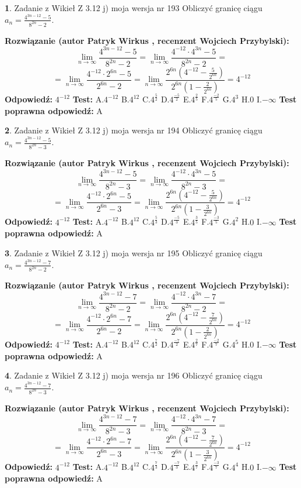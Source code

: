 \documentclass[12pt, a4paper]{article}
\theoremstyle{definition} %
\newtheorem{zad}{}
\newcommand{\zadStart}[1]{\begin{zad}#1\newline}
\newcommand{\zadStop}{\end{zad}}
\newcommand{\rozwStart}[2]{\noindent \textbf{Rozwiązanie (autor #1 , recenzent #2): }\newline}
\newcommand{\rozwStop}{\newline}
\newcommand{\odpStart}{\noindent \textbf{Odpowiedź:}\newline}
\newcommand{\odpStop}{\newline}
\newcommand{\testStart}{\noindent \textbf{Test:}\newline}
\newcommand{\testStop}{\newline}
\newcommand{\kluczStart}{\noindent \textbf{Test poprawna odpowiedź:}\newline}
\newcommand{\kluczStop}{\newline}
\begin{document}
\zadStart{Zadanie z Wikieł Z 3.12 j) moja wersja nr 193}
Obliczyć granicę ciągu $a_{n}=\frac{4^{3n-12}-5}{8^{2n}-2}$.
\zadStop
\rozwStart{Patryk Wirkus}{Wojciech Przybylski}
$$\lim\limits_{n\to\infty}\frac{4^{3n-12}-5}{8^{2n}-2}= \lim\limits_{n\to\infty}\frac{4^{-12} \cdot 4^{3n}-5}{8^{2n}-2}=$$
$$= \lim\limits_{n\to\infty}\frac{4^{-12} \cdot 2^{6n}-5}{2^{6n}-2}= \lim\limits_{n\to\infty}\frac{2^{6n}(4^{-12} - \frac{5}{2^{6n}})}{2^{6n}(1-\frac{2}{2^{6n}})}= 4^{-12}$$
\rozwStop
\odpStart
$4^{-12}$
\odpStop
\testStart
A.$4^{-12}$
B.$4^{12}$
C.$4^{\frac{5}{2}}$
D.$4^{\frac{-5}{2}}$
E.$4^{\frac{2}{5}}$
F.$4^{\frac{-2}{5}}$
G.$4^{3}$
H.$0$
I.$-\infty$
\testStop
\kluczStart
A
\kluczStop



\zadStart{Zadanie z Wikieł Z 3.12 j) moja wersja nr 194}
Obliczyć granicę ciągu $a_{n}=\frac{4^{3n-12}-5}{8^{2n}-3}$.
\zadStop
\rozwStart{Patryk Wirkus}{Wojciech Przybylski}
$$\lim\limits_{n\to\infty}\frac{4^{3n-12}-5}{8^{2n}-3}= \lim\limits_{n\to\infty}\frac{4^{-12} \cdot 4^{3n}-5}{8^{2n}-3}=$$
$$= \lim\limits_{n\to\infty}\frac{4^{-12} \cdot 2^{6n}-5}{2^{6n}-3}= \lim\limits_{n\to\infty}\frac{2^{6n}(4^{-12} - \frac{5}{2^{6n}})}{2^{6n}(1-\frac{3}{2^{6n}})}= 4^{-12}$$
\rozwStop
\odpStart
$4^{-12}$
\odpStop
\testStart
A.$4^{-12}$
B.$4^{12}$
C.$4^{\frac{5}{3}}$
D.$4^{\frac{-5}{3}}$
E.$4^{\frac{3}{5}}$
F.$4^{\frac{-3}{5}}$
G.$4^{2}$
H.$0$
I.$-\infty$
\testStop
\kluczStart
A
\kluczStop



\zadStart{Zadanie z Wikieł Z 3.12 j) moja wersja nr 195}
Obliczyć granicę ciągu $a_{n}=\frac{4^{3n-12}-7}{8^{2n}-2}$.
\zadStop
\rozwStart{Patryk Wirkus}{Wojciech Przybylski}
$$\lim\limits_{n\to\infty}\frac{4^{3n-12}-7}{8^{2n}-2}= \lim\limits_{n\to\infty}\frac{4^{-12} \cdot 4^{3n}-7}{8^{2n}-2}=$$
$$= \lim\limits_{n\to\infty}\frac{4^{-12} \cdot 2^{6n}-7}{2^{6n}-2}= \lim\limits_{n\to\infty}\frac{2^{6n}(4^{-12} - \frac{7}{2^{6n}})}{2^{6n}(1-\frac{2}{2^{6n}})}= 4^{-12}$$
\rozwStop
\odpStart
$4^{-12}$
\odpStop
\testStart
A.$4^{-12}$
B.$4^{12}$
C.$4^{\frac{7}{2}}$
D.$4^{\frac{-7}{2}}$
E.$4^{\frac{2}{7}}$
F.$4^{\frac{-2}{7}}$
G.$4^{5}$
H.$0$
I.$-\infty$
\testStop
\kluczStart
A
\kluczStop



\zadStart{Zadanie z Wikieł Z 3.12 j) moja wersja nr 196}
Obliczyć granicę ciągu $a_{n}=\frac{4^{3n-12}-7}{8^{2n}-3}$.
\zadStop
\rozwStart{Patryk Wirkus}{Wojciech Przybylski}
$$\lim\limits_{n\to\infty}\frac{4^{3n-12}-7}{8^{2n}-3}= \lim\limits_{n\to\infty}\frac{4^{-12} \cdot 4^{3n}-7}{8^{2n}-3}=$$
$$= \lim\limits_{n\to\infty}\frac{4^{-12} \cdot 2^{6n}-7}{2^{6n}-3}= \lim\limits_{n\to\infty}\frac{2^{6n}(4^{-12} - \frac{7}{2^{6n}})}{2^{6n}(1-\frac{3}{2^{6n}})}= 4^{-12}$$
\rozwStop
\odpStart
$4^{-12}$
\odpStop
\testStart
A.$4^{-12}$
B.$4^{12}$
C.$4^{\frac{7}{3}}$
D.$4^{\frac{-7}{3}}$
E.$4^{\frac{3}{7}}$
F.$4^{\frac{-3}{7}}$
G.$4^{4}$
H.$0$
I.$-\infty$
\testStop
\kluczStart
A
\kluczStop
\end{document}
